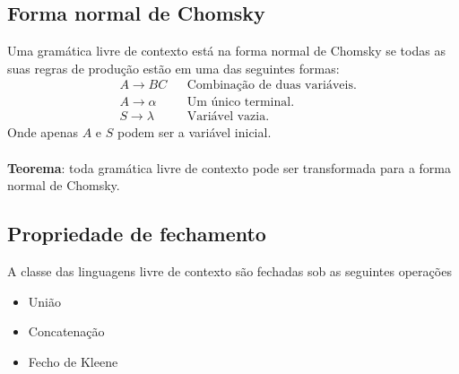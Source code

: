 \documentclass[11pt]{article}
\begin{document}
\subsection{Forma normal de Chomsky}
\label{sec:org1d476f0}
Uma gramática livre de contexto está na forma normal de Chomsky se todas as suas regras
de produção estão em uma das seguintes formas:
\begin{align*}
  & A \to BC && \text{Combinação de duas variáveis.} \\
  & A \to \alpha && \text{Um único terminal.} \\
  & S \to \lambda && \text{Variável vazia.}
\end{align*}
Onde apenas \(A\) e \(S\) podem ser a variável inicial. \\ \\
\textbf{Teorema}: toda gramática livre de contexto pode ser transformada para a forma normal
de Chomsky.
\subsection{Propriedade de fechamento}
\label{sec:org89ba51a}
A classe das linguagens livre de contexto são fechadas sob as seguintes operações
\begin{itemize}[itemsep=0pt]
\item União
\item Concatenação
\item Fecho de Kleene
\end{itemize}
\pagebreak
\end{document}
